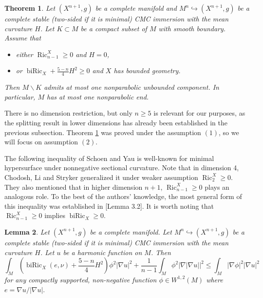 \documentclass[11pt,letterpaper]{amsart}
\DeclareMathOperator{\Ric}{Ric}
\DeclareMathOperator{\biRic}{biRic}
\newtheorem{theorem}{Theorem}[section]
\newtheorem{lemma}[theorem]{Lemma}
\theoremstyle{definition}
\theoremstyle{remark}
\numberwithin{equation}{section}
\begin{document}
\begin{theorem}\label{oneend3}
Let $(X^{n+1},g)$ be a complete manifold and $M^n\hookrightarrow (X^{n+1},g)$ be a complete stable (two-sided if it is minimal) CMC immersion with the mean curvature $H$. Let $K\subset M$ be a compact subset of $M$ with smooth boundary. Assume that
    \begin{itemize}
        \item[(1)]  either $\Ric^X_{n-1}\geq 0$ and $H=0$,
        \item[(2)] or $\biRic_X+\frac{5-n}{4}H^2\geqslant 0$ and $X$ has bounded geometry.
    \end{itemize}
     Then $M\backslash K$ admits at most one nonparabolic unbounded component. In particular, $M$ has at most one nonparabolic end.
\end{theorem} 
There is no dimension restriction, but only $n\geq 5$ is relevant for our purposes, as the splitting result in lower dimensions has already been established in the previous subsection. Theorem \ref{oneend3} was proved under the assumption $(1)$, so we will focus on assumption $(2)$. 


The following inequality of Schoen and Yau is well-known for minimal hypersurface under nonnegative sectional curvature. Note that in dimension 4, Chodosh, Li and Stryker \cite{chodosh-li-stryker} generalized it under weaker assumption $\Ric^X_2\geq 0$. They also mentioned that in higher dimension $n+1$, $\Ric^X_{n-1}\geq 0$ plays an analogous role. To the best of the authors’ knowledge, the most general form of this inequality was established in \cite{Cheng-Cheung-Zhou-CMC}[Lemma 3.2]. It is worth noting that $\Ric^X_{n-1}\geq 0$ implies $\biRic_X\geq0.$  

\begin{lemma}\label{SYL}\cite[Lemma 3.2]{Cheng-Cheung-Zhou-CMC}
	Let $(X^{n+1},g)$ be a complete manifold. Let $M^n\hookrightarrow (X^{n+1},g)$ be a complete stable (two-sided if it is minimal) CMC immersion with the mean curvature $H$. Let $u$ be a harmonic function on $M$. Then
	\begin{equation}\label{SY}
		\int_{M}(\biRic_X(e,\nu)+\frac{5-n}{4}H^2)\phi^2|\nabla u|^2+\frac{1}{n-1}\int_M \phi^2 |\nabla|\nabla u||^2\leqslant \int_M |\nabla \phi|^2|\nabla u|^2
	\end{equation}
for any compactly supported, non-negative function $\phi\in W^{1,2}(M)$ where $e=\nabla u/|\nabla u|.$ %
\end{lemma}
\end{document}
